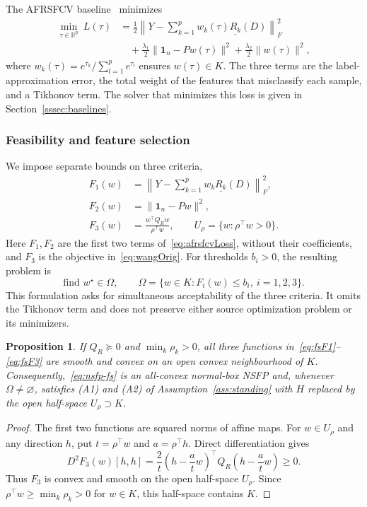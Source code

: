\documentclass[]{interact}
\theoremstyle{plain}
\newtheorem{proposition}[theorem]{Proposition}
\theoremstyle{definition}
\theoremstyle{remark}
\newcommand{\R}{\mathbb{R}}
\begin{document}
The AFRSFCV baseline~\citep{wang2026afrsfcv} minimizes
\begin{equation}\label{eq:afrsfcvLoss}
\begin{split}
\min_{\tau\in\R^p}\ L(\tau)
&=\frac12\left\|Y-\sum_{k=1}^{p}w_k(\tau)\underline{R_k}(D)\right\|_F^2\\
&\quad+\frac{\lambda_1}{2}\|\mathbf1_n-Pw(\tau)\|^2+\frac{\lambda_2}{2}\|w(\tau)\|^2,
\end{split}
\end{equation}
where $w_k(\tau)=e^{\tau_k}/\sum_{l=1}^{p}e^{\tau_l}$ ensures $w(\tau)\in K$. The three terms are the label-approximation error, the total weight of the features that misclassify each sample, and a Tikhonov term.
The solver that minimizes this loss is given in Section~\ref{sssec:baselines}.

\subsubsection{Feasibility and feature selection}\label{ssec:reduction}\label{ssec:selection}
We impose separate bounds on three criteria,
\begin{align}
F_1(w)&=\left\|Y-\sum_{k=1}^{p}w_k\underline{R_k}(D)\right\|_F^2,\label{eq:fsF1}\\
F_2(w)&=\|\mathbf1_n-Pw\|^2,\label{eq:fsF2}\\
F_3(w)&=\frac{w^{\top}Q_Rw}{\rho^{\top}w},\qquad U_\rho=\{w:\rho^{\top}w>0\}.\label{eq:fsF3}
\end{align}
Here $F_1,F_2$ are the first two terms of~\eqref{eq:afrsfcvLoss}, without their coefficients, and $F_3$ is the objective in~\eqref{eq:wangOrig}. For thresholds $b_i>0$, the resulting problem is
\begin{equation}\label{eq:nsfp-fs}
\text{find }w^\star\in\Omega,\qquad \Omega=\{w\in K:F_i(w)\le b_i,\ i=1,2,3\}.
\end{equation}
This formulation asks for simultaneous acceptability of the three criteria. It omits the Tikhonov term and does not preserve either source optimization problem or its minimizers.

\begin{proposition}\label{prop:fs-reg}
If $Q_R\succeq0$ and $\min_k\rho_k>0$, all three functions in~\eqref{eq:fsF1}--\eqref{eq:fsF3} are smooth and convex on an open convex neighbourhood of $K$. Consequently,~\eqref{eq:nsfp-fs} is an all-convex normal-box NSFP and, whenever $\Omega\ne\varnothing$, satisfies (A1) and (A2) of Assumption~\ref{ass:standing} with $H$ replaced by the open half-space $U_\rho\supset K$.
\end{proposition}
\begin{proof}
The first two functions are squared norms of affine maps. For $w\in U_\rho$ and any direction $h$, put $t=\rho^{\top}w$ and $a=\rho^{\top}h$. Direct differentiation gives
\begin{equation}\label{eq:fsF3-curvature}
D^2F_3(w)[h,h]=\frac2t\left(h-\frac atw\right)^{\!\top}Q_R\left(h-\frac atw\right)\ge0.
\end{equation}
Thus $F_3$ is convex and smooth on the open half-space $U_\rho$. Since $\rho^{\top}w\ge\min_k\rho_k>0$ for $w\in K$, this half-space contains $K$.
\end{proof}
\end{document}
